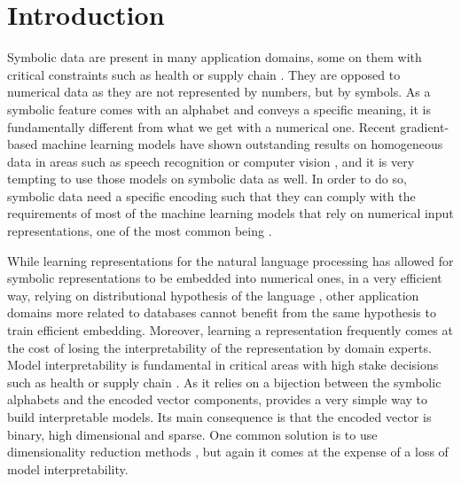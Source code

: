 \section{Introduction}\label{sec:intro}

Symbolic data are present in many application domains, some on them with critical constraints such as health \cite{PublicHealth} or supply chain \cite{SCPricing}. They are opposed to numerical data as they are not represented by numbers, but by symbols. As a symbolic feature comes with an alphabet and conveys a specific meaning, it is fundamentally different from what we get with a numerical one. Recent gradient-based machine learning models have shown outstanding results on homogeneous data in areas such as speech recognition or computer vision \cite{w2v-BERT} \cite{ModelSoups}, and it is very tempting to use those models on symbolic data as well. In order to do so, symbolic data need a specific encoding such that they can comply with the requirements of most of the machine learning models that rely on numerical input representations, one of the most common being \ohe \cite{ohe}.

While learning representations for the natural language processing has allowed for symbolic representations to be embedded into numerical ones, in a very efficient way, relying on distributional hypothesis of the language \cite{MLPandNLP}, other application domains more related to databases cannot benefit from the same hypothesis to train efficient embedding. Moreover, learning a representation frequently comes at the cost of losing the interpretability of the representation by domain experts. Model interpretability is fundamental in critical areas with high stake decisions such as health or supply chain \cite{Stop}.
As it relies on a bijection between the symbolic alphabets and the encoded vector components, \ohe provides a very simple way to build interpretable models. Its main consequence is that the encoded vector is binary, high dimensional and sparse. One common solution is to use dimensionality reduction methods \cite{ExploringDimensionality} \cite{ModernDimensionReduction}, but again it comes at the expense of a loss of model interpretability.

